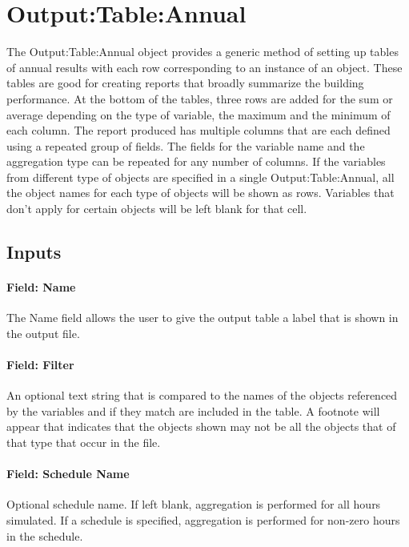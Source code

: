 \section{Output:Table:Annual}\label{outputtableannual}

The Output:Table:Annual object provides a generic method of setting up tables of annual results with each row corresponding to an instance of an object. These tables are good for creating reports that broadly summarize the building performance. At the bottom of the tables, three rows are added for the sum or average depending on the type of variable, the maximum and the minimum of each column. The report produced has multiple columns that are each defined using a repeated group of fields. The fields for the variable name and the aggregation type can be repeated for any number of columns. If the variables from different type of objects are specified in a single Output:Table:Annual, all the object names for each type of objects will be shown as rows. Variables that don't apply for certain objects will be left blank for that cell.

\subsection{Inputs}\label{inputs-062}

\paragraph{Field: Name}\label{field-name-060}

The Name field allows the user to give the output table a label that is shown in the output file.

\paragraph{Field: Filter}\label{field-filter}

An optional text string that is compared to the names of the objects referenced by the variables and if they match are included in the table. A footnote will appear that indicates that the objects shown may not be all the objects that of that type that occur in the file.

\paragraph{Field: Schedule Name}\label{field-schedule-name-008}

Optional schedule name. If left blank, aggregation is performed for all hours simulated. If a schedule is specified, aggregation is performed for non-zero hours in the schedule.

